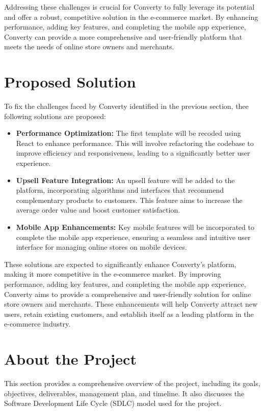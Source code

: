 Addressing these challenges is crucial for Converty to fully leverage its potential and offer a robust, competitive solution in the e-commerce market. By enhancing performance, adding key features, and completing the mobile app experience, Converty can provide a more comprehensive and user-friendly platform that meets the needs of online store owners and merchants.

\section{Proposed Solution}
To fix the challenges faced by Converty identified in the previous section, thee following solutions are proposed:

\begin{itemize}
  \item \textbf{Performance Optimization:} The first template will be recoded using React to enhance performance. This will involve refactoring the codebase to improve efficiency and responsiveness, leading to a significantly better user experience.
  \item \textbf{Upsell Feature Integration:} An upsell feature will be added to the platform, incorporating algorithms and interfaces that recommend complementary products to customers. This feature aims to increase the average order value and boost customer satisfaction.
  \item \textbf{Mobile App Enhancements:} Key mobile features will be incorporated to complete the mobile app experience, ensuring a seamless and intuitive user interface for managing online stores on mobile devices.
\end{itemize}

These solutions are expected to significantly enhance Converty's platform, making it more competitive in the e-commerce market. By improving performance, adding key features, and completing the mobile app experience, Converty aims to provide a comprehensive and user-friendly solution for online store owners and merchants. These enhancements will help Converty attract new users, retain existing customers, and establish itself as a leading platform in the e-commerce industry.
\newline

\section{About the Project}
This section provides a comprehensive overview of the project, including its goals, objectives, deliverables, management plan, and timeline. It also discusses the Software Development Life Cycle (SDLC) model used for the project.

